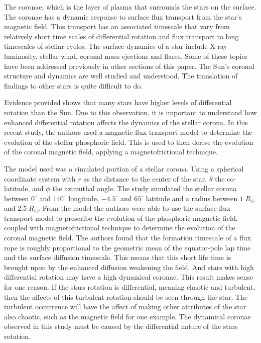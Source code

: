 \documentclass[a4paper, 12pt]{article}
\begin{document}
The coronae, which is the layer of plasma that surrounds the stars on the surface. The coronae has a dynamic response to surface flux transport from the star's magnetic field. This transport has an associated timescale that vary from relatively short time scales of differential rotation and flux transport to long timescales of stellar cycles. The surface dynamics of a star include X-ray luminosity, stellar wind, coronal mass ejections and flares. Some of these topics have been addressed previously in other sections of this paper. The Sun's coronal structure and dynamics are well studied and understood. The translation of findings to other stars is quite difficult to do. 

Evidence provided shows that many stars have higher levels of differential rotation than the Sun. Due to this observation, it is important to understand how enhanced differential rotation affects the dynamics of the stellar corona. In this recent study, the authors used a magnetic flux transport model to determine the evolution of the stellar phosphoric field. This is used to then derive the evolution of the coronal magnetic field, applying a magnetofrictional technique.

The model used was a simulated portion of a stellar corona. Using a spherical coordinate system with $r$ as the distance to the center of the star, $\theta$ the co-latitude, and $\phi$ the azimuthal angle. The study simulated the stellar corona between $0^{\circ}$ and $140^{\circ}$ longitude, $-4.5^{\circ}$ and $65^{\circ}$ latitude and a radius between $1 \; R_{\odot}$ and $2.5 \; R_{\odot}$. From the model the authors were able to use the surface flux transport model to prescribe the evolution of the phosphoric magnetic field, coupled with magnetofrictional technique to determine the evolution of the coronal magnetic field. The authors found that the formation timescale of a flux rope is roughly proportional to the geometric mean of the equator-pole lap time and the surface diffusion timescale. This means that this short life time is brought upon by the enhanced diffusion weakening the field. And stars with high differential rotation may have a high dynamical coronae. This result makes sense for one reason. If the stars rotation is differential, meaning chaotic and turbulent, then the affects of this turbulent rotation should be seen through the star. The turbulent occurrence will have the affect of making other attributes of the star also chaotic, such as the magnetic field for one example. The dynamical coronae observed in this study must be caused by the differential nature of the stars rotation. 
\end{document}
